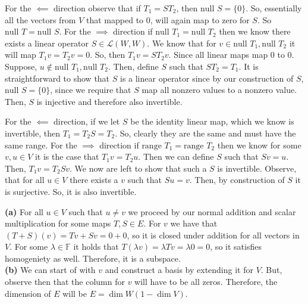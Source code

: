 \documentclass[10pt, twocolumn]{article}
\newcommand{\F}{\mathbb{F}}
\newcommand{\LinearMap}[2]{\mathcal{L}(#1, #2)}
\newcommand{\nul}{\text{null }}
\newcommand{\range}{\text{range }}
\begin{document}
\begin{q}[4]
    For the $ \impliedby $ direction observe that if $ T_1 = ST_2 $, then $ \nul S = \{0\} $. So, essentially all the vectors from $ V $ that mapped to 0, will again map to zero for $ S $.
    So $ \nul T = \nul S $. 
    For the $ \implies $ direction if $ \nul T_1 = \nul T_2 $ then we know there exists a linear operator $ S \in \LinearMap{W}{W} $. 
    We know that for $ v \in \nul T_1, \nul T_2 $ it will map $ T_1v = T_2 v = 0 $. So, then $ T_1 v = ST_2 v $. 
    Since all linear maps map 0 to 0. 
    Suppose, $ u \not \in \nul T_1, \nul T_2 $. Then, define $ S $ such that $ ST_2 = T_1 $.  
    It is straightforward to show that $ S $ is a linear operator since by our construction of $ S $, $ \nul S = \{0\} $, since we require that $ S $ map all nonzero values to a nonzero value. 
    Then, $ S $ is injective and therefore also invertible.
\end{q}
\begin{q}[5]
    For the $ \impliedby $ direction, if we let $ S $ be the identity linear map, which we know is invertible, then $ T_1 = T_2S = T_2 $. So, clearly they are the same and must have the same range.
    For the $ \implies $ direction if $ \range T_1 = \range T_2 $ then we know for some $ v, u \in V $ it is the case that $ T_1v = T_2u $. 
    Then we can define $ S $ such that $ Sv = u $. 
    Then, $ T_1v = T_2Sv $. 
    We now are left to show that such a $ S $ is invertible. 
    Observe, that for all $ u \in V $ there exists a $ v $ such that $ Su = v $. Then, by construction of $ S $ it is surjective. 
    So, it is also invertible.
\end{q}
\begin{q}[7]
    \textbf{(a)}
    For all $ u \in V $ such that $ u \neq v $ we proceed by our normal addition and scalar multiplication for some maps $ T, S \in E $. 
    For $ v $ we have that $ (T+S)(v) = Tv + Sv = 0 + 0 $, so it is closed under addition for all vectors in $ V $. 
    For some $ \lambda \in \F $ it holds that $ T(\lambda v) = \lambda Tv  = \lambda 0 = 0 $, so it satisfies homogeniety as well. Therefore, it is a subspace. \\
    \textbf{(b)} 
    We can start of with $ v $ and construct a basis by extending it for $ V $. 
    But, observe then that the column for $ v $ will have to be all zeros. 
    Therefore, the dimension of $ E $ will be $ E = \dim W (1 - \dim V) $. 
\end{q}
\end{document}
